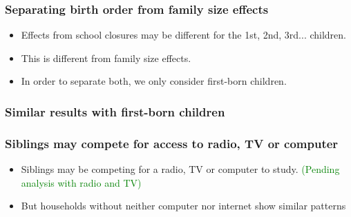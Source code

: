 \documentclass{beamer}
\begin{document}
\begin{frame}
    \label{frame:birthorder}
    \frametitle{Separating birth order from family size effects}
       \begin{itemize}
           \item Effects from school closures may be different for the 1st, 2nd, 3rd... children.
           \item This is different from family size effects.
           \item In order to separate both, we only consider first-born children.
       \end{itemize}
\end{frame}

\begin{frame}
    \label{frame:birthorder_intro}
    \frametitle{Similar results with first-born children}
        {
    }  

    \begin{flushleft}
        \hyperlink{frame:mechanisms}{}
    \end{flushleft}
\end{frame}


\begin{frame}
    \label{frame:resources_intro}
    \frametitle{Siblings may compete for access to radio, TV or computer}
       \begin{itemize}
           \item Siblings may be competing for a radio, TV or computer to study. \textcolor{green}{(Pending analysis with radio and TV)}
           \item But households without neither computer nor internet show similar patterns 
       \end{itemize}
\end{frame}
\end{document}

